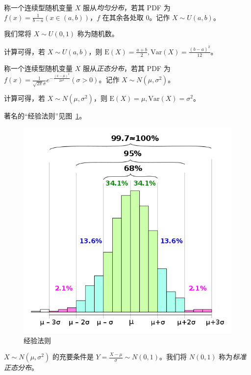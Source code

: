 \documentclass[../main.tex]{subfiles}
\begin{document}
\begin{definition}\label{def:2.5.1}
称一个连续型随机变量 $X$ 服从\emph{均匀分布}，若其 PDF 为 $f(x)=\frac{1}{b-a}(x\in(a,b))$，$f$ 在其余各处取 $0$。记作 $X\sim U(a,b)$。
\end{definition}

我们常将 $X\sim U(0,1)$ 称为随机数。

计算可得，若 $X\sim U(a,b)$，则 $\mathrm{E}(X)=\frac{a+b}{2},\mathrm{Var}(X)=\frac{(b-a)^2}{12}$。

\begin{definition}\label{def:2.5.2}
称一个连续型随机变量 $X$ 服从\emph{正态分布}，若其 PDF 为 $f(x)=\frac{1}{\sqrt{2\pi}\sigma}e^{-\frac{(x-\mu)^2}{2\sigma^2}}(\sigma>0)$。记作 $X\sim N(\mu,\sigma^2)$。
\end{definition}

计算可得，若 $X\sim N(\mu,\sigma^2)$，则 $\mathrm{E}(X)=\mu,\mathrm{Var}(X)=\sigma^2$。

著名的“经验法则”见图~\ref{fig:2.5.1}。

\begin{figure}[!h]
    \centering
    \includegraphics[scale=0.5]{figures/empirical_rule.png}
    \caption{经验法则}
    \label{fig:2.5.1}
\end{figure}

$X\sim N(\mu,\sigma^2)$ 的充要条件是 $Y=\frac{X-\mu}{\sigma}\sim N(0,1)$。我们将 $N(0,1)$ 称为\emph{标准正态分布}。
\end{document}
